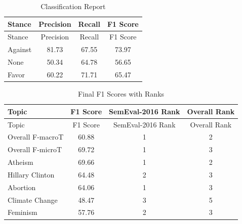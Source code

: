 \documentclass[]{article}
\begin{document}
\begin{longtable}[]{@{}lccc@{}}
\caption{\label{fig:classreport_table} Classification
Report}\tabularnewline
\toprule
Stance & Precision & Recall & F1 Score\tabularnewline
\midrule
\endfirsthead
\toprule
Stance & Precision & Recall & F1 Score\tabularnewline
\midrule
\endhead
Against & 81.73 & 67.55 & 73.97\tabularnewline
None & 50.34 & 64.78 & 56.65\tabularnewline
Favor & 60.22 & 71.71 & 65.47\tabularnewline
\bottomrule
\end{longtable}

\begin{longtable}[]{@{}lccc@{}}
\caption{\label{fig:f1rank_table} Final F1 Scores with
Ranks}\tabularnewline
\toprule
Topic & F1 Score & SemEval-2016 Rank & Overall Rank\tabularnewline
\midrule
\endfirsthead
\toprule
Topic & F1 Score & SemEval-2016 Rank & Overall Rank\tabularnewline
\midrule
\endhead
Overall F-macroT & 60.88 & 1 & 2\tabularnewline
Overall F-microT & 69.72 & 1 & 3\tabularnewline
Atheism & 69.66 & 1 & 2\tabularnewline
Hillary Clinton & 64.48 & 2 & 3\tabularnewline
Abortion & 64.06 & 1 & 3\tabularnewline
Climate Change & 48.47 & 3 & 5\tabularnewline
Feminism & 57.76 & 2 & 3\tabularnewline
\bottomrule
\end{longtable}
\end{document}
